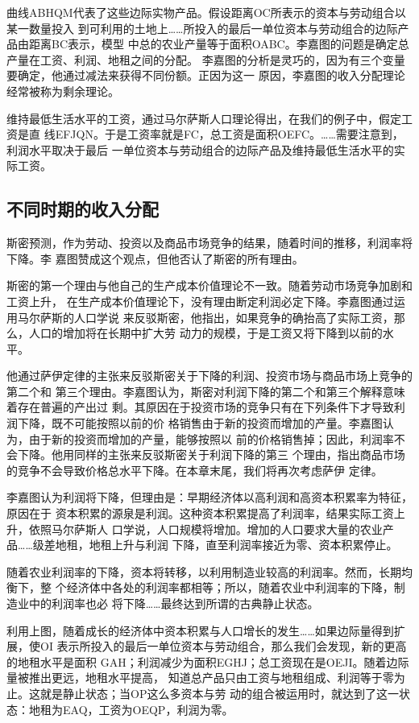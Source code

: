 曲线ABHQM代表了这些边际实物产品。假设距离OC所表示的资本与劳动组合以某一数量投入
到可利用的土地上……所投入的最后一单位资本与劳动组合的边际产品由距离BC表示，模型
中总的农业产量等于面积OABC。李嘉图的问题是确定总产量在工资、利润、地租之间的分配。
李嘉图的分析是灵巧的，因为有三个变量要确定，他通过减法来获得不同份额。正因为这一
原因，李嘉图的收入分配理论经常被称为剩余理论。

维持最低生活水平的工资，通过马尔萨斯人口理论得出，在我们的例子中，假定工资是直
线EFJQN。于是工资率就是FC，总工资是面积OEFC。……需要注意到，利润水平取决于最后
一单位资本与劳动组合的边际产品及维持最低生活水平的实际工资。

\subsection{不同时期的收入分配}

斯密预测，作为劳动、投资以及商品市场竞争的结果，随着时间的推移，利润率将下降。李
嘉图赞成这个观点，但他否认了斯密的所有理由。

斯密的第一个理由与他自己的生产成本价值理论不一致。随着劳动市场竞争加剧和工资上升，
在生产成本价值理论下，没有理由断定利润必定下降。李嘉图通过运用马尔萨斯的人口学说
来反驳斯密，他指出，如果竞争的确抬高了实际工资，那么，人口的增加将在长期中扩大劳
动力的规模，于是工资又将下降到以前的水平。

他通过萨伊定律的主张来反驳斯密关于下降的利润、投资市场与商品市场上竞争的第二个和
第三个理由。李嘉图认为，斯密对利润下降的第二个和第三个解释意味着存在普遍的产出过
剩。其原因在于投资市场的竞争只有在下列条件下才导致利润下降，既不可能按照以前的价
格销售由于新的投资而增加的产量。李嘉图认为，由于新的投资而增加的产量，能够按照以
前的价格销售掉；因此，利润率不会下降。他用同样的主张来反驳斯密关于利润下降的第三
个理由，指出商品市场的竞争不会导致价格总水平下降。在本章末尾，我们将再次考虑萨伊
定律。

李嘉图认为利润将下降，但理由是：早期经济体以高利润和高资本积累率为特征，原因在于
资本积累的源泉是利润。这种资本积累提高了利润率，结果实际工资上升，依照马尔萨斯人
口学说，人口规模将增加。增加的人口要求大量的农业产品……级差地租，地租上升与利润
下降，直至利润率接近为零、资本积累停止。

随着农业利润率的下降，资本将转移，以利用制造业较高的利润率。然而，长期均衡下，整
个经济体中各处的利润率都相等；所以，随着农业中利润率的下降，制造业中的利润率也必
将下降……最终达到所谓的古典静止状态。

利用上图，随着成长的经济体中资本积累与人口增长的发生……如果边际量得到扩展，使OI
表示所投入的最后一单位资本与劳动组合，那么我们会发现，新的更高的地租水平是面积
GAH；利润减少为面积EGHJ；总工资现在是OEJI。随着边际量被推出更远，地租水平提高，
知道总产品只由工资与地租组成、利润等于零为止。这就是静止状态；当OP这么多资本与劳
动的组合被运用时，就达到了这一状态：地租为EAQ，工资为OEQP，利润为零。

